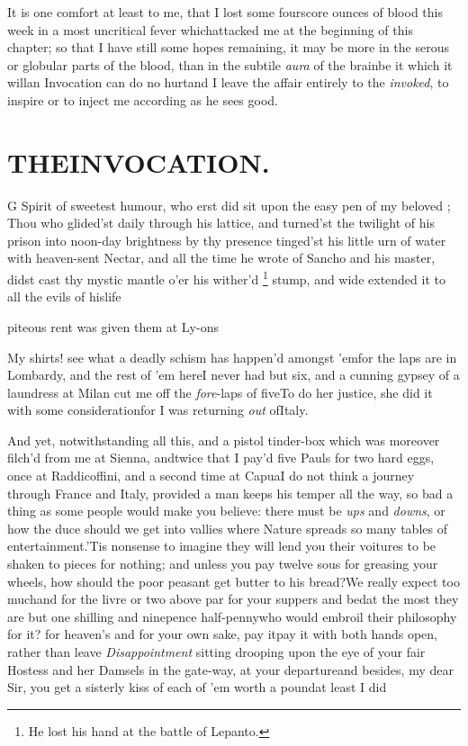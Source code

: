 \documentclass{article}
\begin{document}
It is one comfort at least to me, that I lost some fourscore ounces of blood this
week in a most uncritical fever which\pb attacked me at the beginning of this
chapter; so that I have still some hopes remaining, it may be more in the serous or
globular parts of the blood, than in the subtile \textit{aura} of the brain\tsh be
it which it will\tsk an Invocation can do no hurt\tsh and I leave the affair entirely
to the \textit{invoked}, to inspire or to inject me according as he sees good.

\newpage
\section{{THE\quad INVOCATION}.}


\lettrine{G}{} Spirit of sweetest hu\-mour, who erst did sit upon the easy pen of my
beloved ;\break 
Thou who glided’st daily through his lattice, and
turned’st the twilight of his prison into noon-day brightness by thy presence\tsh
tinged’st his little urn of water with heaven-sent Nectar, and all the time he wrote
of Sancho and his master, didst cast thy mystic mantle o’er his wither’d
\footnote{\enspace He lost his hand at the battle of Lepanto.} stump, and wide
extended it to all the evils of his\break life\tsh

\newpage
\noindent
{}
piteous rent was given them at Ly-\break ons\tsh

My shirts\thinspace ! see what a deadly schism has happen’d amongst
’em\tsk for the laps are in Lombardy, and the rest
of ’em here\tsk I never had but six, and a cunning gypsey
of a laundress at Milan cut me off the \textit{fore}-laps of
five\tsk To do her justice, she did it with some
consideration\tsk for I was returning \textit{out} of\break Italy.

And yet, notwithstanding all this, and a pistol tinder-box which
was moreover filch’d from me at Sienna, and\pb twice that
I pay’d five Pauls for two hard eggs, once at
Raddicoffini, and a second time at Capua\tsk I do
not think a journey through France and Italy,
provided a man keeps his temper all the way, so bad a thing as some
people would make you believe: there must be \textit{ups} and
\textit{downs}, or how the duce should we get into vallies where
Nature spreads so many tables of entertainment.\tsk ’Tis
nonsense to imagine they will lend you their voitures to be shaken
to pieces for nothing; and unless you pay twelve sous for greasing
your wheels, how should the poor peasant get butter to his
bread?\break\tsk We really expect too much\tsk and for the livre or
two above par for your suppers and bed\tsk at the most they are
but one shilling and ninepence half-\pb penny\tsh who would
embroil their philosophy for it? for heaven’s and for your
own sake, pay it\tsh pay it with both hands open, rather
than leave \textit{Disappointment} sitting drooping upon the eye of
your fair Hostess and her Damsels in the gate-way, at your
departure\tsk and besides, my dear Sir, you get a sisterly kiss
of each of ’em worth a pound\tsh\break at least I
did\tsh
\end{document}
